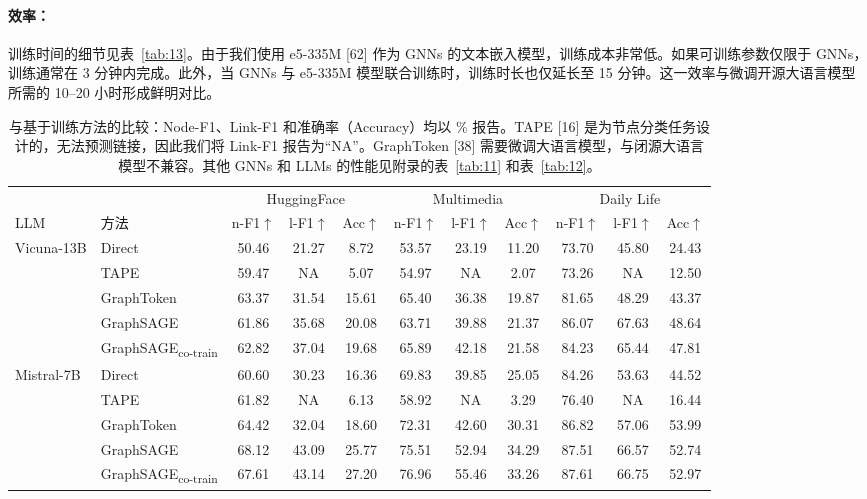 \documentclass[11pt,UTF8,fontset=fandol]{ctexart}
\begin{document}
\paragraph{效率：}训练时间的细节见表~\ref{tab:13}。由于我们使用 e5-335M [62] 作为 GNNs 的文本嵌入模型，训练成本非常低。如果可训练参数仅限于 GNNs，训练通常在 3 分钟内完成。此外，当 GNNs 与 e5-335M 模型联合训练时，训练时长也仅延长至 15 分钟。这一效率与微调开源大语言模型所需的 10--20 小时形成鲜明对比。

\begin{table}[H]\centering
\caption{与基于训练方法的比较：Node-F1、Link-F1 和准确率（Accuracy）均以 \% 报告。TAPE [16] 是为节点分类任务设计的，无法预测链接，因此我们将 Link-F1 报告为“NA”。GraphToken [38] 需要微调大语言模型，与闭源大语言模型不兼容。其他 GNNs 和 LLMs 的性能见附录的表~\ref{tab:11} 和表~\ref{tab:12}。}
\label{tab:2}
\small
\setlength{\tabcolsep}{4pt}
\begin{tabular}{llccc ccc ccc}
\toprule
& & \multicolumn{3}{c}{HuggingFace} & \multicolumn{3}{c}{Multimedia} & \multicolumn{3}{c}{Daily Life}\\
\cmidrule(lr){3-5}\cmidrule(lr){6-8}\cmidrule(lr){9-11}
LLM & 方法 & n-F1$\uparrow$ & l-F1$\uparrow$ & Acc$\uparrow$ & n-F1$\uparrow$ & l-F1$\uparrow$ & Acc$\uparrow$ & n-F1$\uparrow$ & l-F1$\uparrow$ & Acc$\uparrow$\\
\midrule
\multirow{5}{*}{Vicuna-13B}
& Direct & 50.46 & 21.27 & 8.72 & 53.57 & 23.19 & 11.20 & 73.70 & 45.80 & 24.43\\
& TAPE & 59.47 & NA & 5.07 & 54.97 & NA & 2.07 & 73.26 & NA & 12.50\\
& GraphToken & 63.37 & 31.54 & 15.61 & 65.40 & 36.38 & 19.87 & 81.65 & 48.29 & 43.37\\
& GraphSAGE & 61.86 & 35.68 & 20.08 & 63.71 & 39.88 & 21.37 & 86.07 & 67.63 & 48.64\\
& GraphSAGE\textsubscript{co-train} & 62.82 & 37.04 & 19.68 & 65.89 & 42.18 & 21.58 & 84.23 & 65.44 & 47.81\\
\midrule
\multirow{5}{*}{Mistral-7B}
& Direct & 60.60 & 30.23 & 16.36 & 69.83 & 39.85 & 25.05 & 84.26 & 53.63 & 44.52\\
& TAPE & 61.82 & NA & 6.13 & 58.92 & NA & 3.29 & 76.40 & NA & 16.44\\
& GraphToken & 64.42 & 32.04 & 18.60 & 72.31 & 42.60 & 30.31 & 86.82 & 57.06 & 53.99\\
& GraphSAGE & 68.12 & 43.09 & 25.77 & 75.51 & 52.94 & 34.29 & 87.51 & 66.57 & 52.74\\
& GraphSAGE\textsubscript{co-train} & 67.61 & 43.14 & 27.20 & 76.96 & 55.46 & 33.26 & 87.61 & 66.75 & 52.97\\

\end{tabular}
\end{table}
\end{document}
